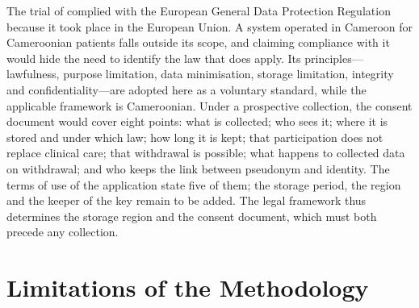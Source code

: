 \documentclass[11pt,a4paper,oneside]{report}
\begin{document}
The trial of \textcite{mihevc2025} complied with the European General Data Protection Regulation because it took place in the European Union. A system operated in Cameroon for Cameroonian patients falls outside its scope, and claiming compliance with it would hide the need to identify the law that does apply. Its principles---lawfulness, purpose limitation, data minimisation, storage limitation, integrity and confidentiality---are adopted here as a voluntary standard, while the applicable framework is Cameroonian. Under a prospective collection, the consent document would cover eight points: what is collected; who sees it; where it is stored and under which law; how long it is kept; that participation does not replace clinical care; that withdrawal is possible; what happens to collected data on withdrawal; and who keeps the link between pseudonym and identity. The terms of use of the application state five of them; the storage period, the region and the keeper of the key remain to be added. The legal framework thus determines the storage region and the consent document, which must both precede any collection.

\section{Limitations of the Methodology}\label{sec:meth-limits}
\end{document}
